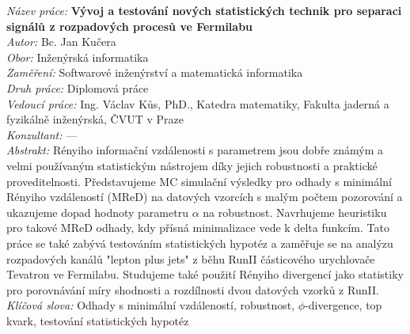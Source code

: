
\newpage

\thispagestyle{empty}

{
\setlength{\parindent}{0pt}
\vspace*{-0.3cm}
\textit{N\'azev pr\'ace:}
\textbf{V\'yvoj a testov\'an\'i nov\'ych statistick\'ych technik pro separaci sign\'al\r{u} z rozpadov\'ych proces\r{u} ve Fermilabu} \\

\textit{Autor:} Bc. Jan Ku\v{c}era \\

\textit{Obor:} In\v{z}en\'yrsk\'a informatika \\

\textit{Zamě\v{r}en\'i:}  Softwarov\'e in\v{z}en\'yrstv\'i a matematick\'a informatika \\

\textit{Druh pr\'ace:} Diplomov\'a pr\'ace \\

\textit{Vedouc\'i pr\'ace:}  Ing. V\'aclav K\r{u}s, PhD., Katedra matematiky, Fakulta jadern\'a a fyzik\'alně in\v{z}en\'yrsk\'a, \v{C}VUT v Praze\\

\textit{Konzultant:}  --- \\

\textit{Abstrakt:} 
R\'enyiho informa\v{c}n\'i vzd\'alenosti s parametrem jsou dob\v{r}e zn\'am\'ym a velmi pou\v{z}\'ivan\'ym statistick\'ym n\'astrojem d\'iky jejich robustnosti a praktick\'e proveditelnosti. P\v{r}edstavujeme MC simula\v{c}n\'i v\'ysledky pro odhady s minim\'aln\'i R\'enyiho vzd\'alenost\'i (MReD) na datov\'ych vzorc\'ich s mal\'ym po\v{c}tem pozorov\'an\'i a ukazujeme dopad hodnoty parametru $\alpha$ na robustnost. Navrhujeme heuristiku pro takov\'e MReD odhady,  kdy p\v{r}\'isn\'a minimalizace vede k delta funkc\'im. Tato pr\'ace se tak\'e zab\'yv\'a testov\'an\'im statistick\'ych hypot\'ez a zamě\v{r}uje se na anal\'yzu rozpadov\'ych kan\'al\r{u} "lepton plus jets" z běhu RunII \v{c}\'asticov\'eho urychlova\v{c}e Tevatron ve Fermilabu. Studujeme tak\'e pou\v{z}it\'i R\'enyiho divergenc\'i jako statistiky pro porovn\'av\'an\'i m\'iry shodnosti a rozd\'ilnosti dvou datov\'ych vzork\r{u} z RunII.\\

\textit{Kl\'i\v{c}ov\'a slova:}  Odhady s minim\'aln\'i vzd\'alenost\'i, robustnost, $\phi$-divergence, top kvark, testov\'an\'i statistick\'ych hypot\'ez

}
